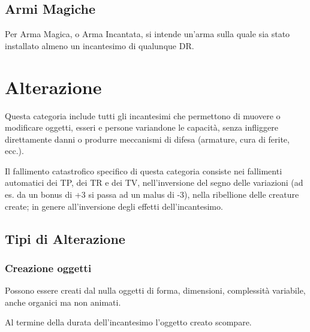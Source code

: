 \subsection{Armi Magiche}
 Per Arma Magica, o Arma Incantata, si intende un'arma sulla
quale sia stato installato almeno un incantesimo di qualunque DR.
\fi

\newcommand{\dt}[1]{\smallskip\noindent {\raggedright\small\bf DT= \parbox[t]{6.5cm}{\it #1}}\par}
\newcommand{\db}[1]{\smallskip\noindent {\raggedright\small\bf DB= \parbox[t]{6.5cm}{\it #1}}\par}

\section{Alterazione} 

Questa categoria include tutti gli incantesimi che permettono di
muovere o modificare oggetti, esseri e persone variandone le
capacit\`a, senza infliggere direttamente danni o produrre
meccanismi di difesa (armature, cura di ferite, ecc.).


Il fallimento catastrofico specifico di questa categoria consiste nei
fallimenti automatici dei TP, dei TR e dei TV, nell'inversione del
segno delle variazioni (ad es. da un bonus di +3 si passa ad un malus
di -3), nella ribellione delle creature create; in genere
all'inversione degli effetti dell'incantesimo.

\subsection{Tipi di Alterazione}

\subsubsection{Creazione oggetti} Possono essere creati dal nulla
oggetti di forma, dimensioni, complessit\`a variabile, anche organici ma
non animati. 

Al termine della durata dell'incantesimo l'oggetto creato scompare.

